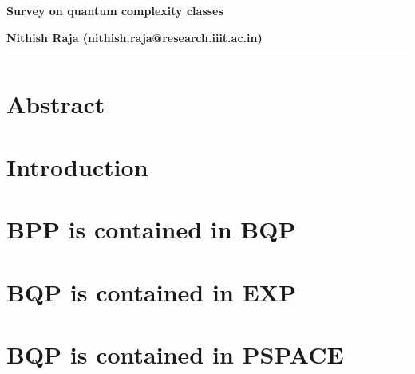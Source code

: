 



\noindent\textbf{\Large Survey on quantum complexity classes}
\vspace{2em}

\noindent
\textbf{Nithish Raja (nithish.raja@research.iiit.ac.in)}\\

\hrule

\section{Abstract}



\section{Introduction}



\section{BPP is contained in BQP}



\section{BQP is contained in EXP}



\section{BQP is contained in PSPACE}







